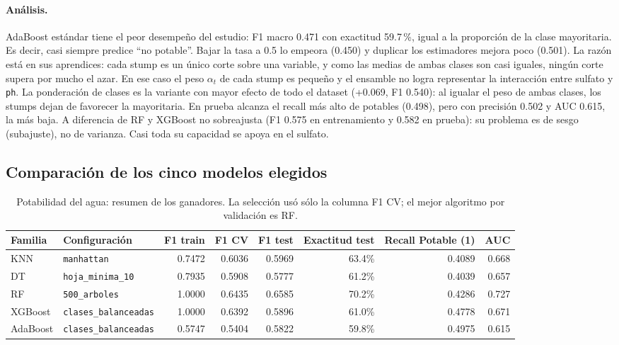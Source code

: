 \documentclass[11pt]{article}
\begin{document}
\paragraph{Análisis.} AdaBoost estándar tiene el peor desempeño del estudio: F1 macro 0.471 con exactitud
59.7\,\%, igual a la proporción de la clase mayoritaria. Es decir, casi siempre
predice ``no potable''. Bajar la tasa a 0.5 lo empeora (0.450) y duplicar los
estimadores mejora poco (0.501). La razón está en sus aprendices: cada stump es un
único corte sobre una variable, y como las medias de ambas clases son casi iguales,
ningún corte supera por mucho el azar. En ese caso el peso $\alpha_t$ de cada stump es
pequeño y el ensamble no logra representar la interacción entre sulfato
y \texttt{ph}. La ponderación de clases es la variante con mayor efecto de todo el
dataset (+0.069, F1 0.540): al igualar el peso de ambas clases, los stumps dejan de
favorecer la mayoritaria. En prueba alcanza el recall más alto de potables (0.498),
pero con precisión 0.502 y AUC 0.615, la más baja. A diferencia de RF y XGBoost no
sobreajusta (F1 0.575 en entrenamiento y 0.582 en prueba): su problema es de sesgo
(subajuste), no de varianza. Casi toda su capacidad se apoya en el sulfato.

\FloatBarrier

\subsection{Comparación de los cinco modelos elegidos}

\begin{table}[H]\centering\footnotesize
\caption{Potabilidad del agua: resumen de los ganadores. La selección usó sólo la columna F1 CV; el mejor algoritmo por validación es RF.}
\begin{tabular}{llrrrrrr}\toprule
Familia & Configuración & F1 train & F1 CV & F1 test & Exactitud test & Recall Potable (1) & AUC \\ \midrule
KNN & \texttt{manhattan} & 0.7472 & 0.6036 & 0.5969 & 63.4\% & 0.4089 & 0.668 \\
DT & \texttt{hoja\_\allowbreak{}minima\_\allowbreak{}10} & 0.7935 & 0.5908 & 0.5777 & 61.2\% & 0.4039 & 0.657 \\
RF & \texttt{500\_\allowbreak{}arboles} & 1.0000 & 0.6435 & 0.6585 & 70.2\% & 0.4286 & 0.727 \\
XGBoost & \texttt{clases\_\allowbreak{}balanceadas} & 1.0000 & 0.6392 & 0.5896 & 61.0\% & 0.4778 & 0.671 \\
AdaBoost & \texttt{clases\_\allowbreak{}balanceadas} & 0.5747 & 0.5404 & 0.5822 & 59.8\% & 0.4975 & 0.615 \\
\bottomrule\end{tabular}
\end{table}
\end{document}
